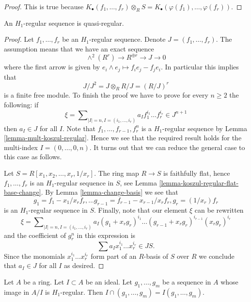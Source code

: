 \begin{proof}
This is true because
$K_\bullet(f_1, \ldots, f_r) \otimes_R S =
K_\bullet(\varphi(f_1), \ldots, \varphi(f_r))$.
\end{proof}

\begin{lemma}
\label{lemma-H1-regular-quasi-regular}
An $H_1$-regular sequence is quasi-regular.
\end{lemma}

\begin{proof}
Let $f_1, \ldots, f_r$ be an $H_1$-regular sequence.
Denote $J = (f_1, \ldots, f_r)$. The assumption means that we have
an exact sequence
$$
\wedge^2(R^r) \to R^{\oplus r} \to J \to 0
$$
where the first arrow is given by $e_i \wedge e_j \mapsto f_ie_j - f_je_i$.
In particular this implies that
$$
J/J^2 = J \otimes_R R/J = (R/J)^r
$$
is a finite free module. To finish the proof we have to prove
for every $n \geq 2$ the following: if
$$
\xi = \sum\nolimits_{|I| = n, I = (i_1, \ldots, i_r)}
a_I f_1^{i_1} \ldots f_r^{i_r} \in J^{n + 1}
$$
then $a_I \in J$ for all $I$. Note that $f_1, \ldots, f_{r - 1}, f_r^n$
is a $H_1$-regular sequence by
Lemma \ref{lemma-mult-koszul-regular}.
Hence we see that the required result holds for
the multi-index $I = (0, \ldots, 0, n)$. It turns out that we can
reduce the general case to this case as follows.

\medskip\noindent
Let $S = R[x_1, x_2, \ldots, x_r, 1/x_r]$.
The ring map $R \to S$ is faithfully
flat, hence $f_1, \ldots, f_r$ is an $H_1$-regular sequence in $S$, see
Lemma \ref{lemma-koszul-regular-flat-base-change}.
By
Lemma \ref{lemma-change-basis}
we see that
$$
g_1 = f_1 - x_1/x_r f_r, \ldots
g_{r - 1} = f_{r - 1} - x_{r - 1}/x_r f_r,
g_r = (1/x_r)f_r
$$
is an $H_1$-regular sequence in $S$. Finally, note that our element
$\xi$ can be rewritten
$$
\xi = \sum\nolimits_{|I| = n, I = (i_1, \ldots, i_r)}
a_I (g_1 + x_r g_r)^{i_1} \ldots (g_{r - 1} + x_r g_r)^{i_{r - 1}}
(x_rg_r)^{i_r}
$$
and the coefficient of $g_r^n$ in this expression is
$$
\sum a_I x_1^{i_1} \ldots x_r^{i_r} \in JS.
$$
Since the monomials $x_1^{i_1} \ldots x_r^{i_r}$ form part of an $R$-basis
of $S$ over $R$ we conclude that $a_I \in J$ for all $I$ as desired.
\end{proof}

\begin{lemma}
\label{lemma-H1-regular-in-quotient}
Let $A$ be a ring. Let $I \subset A$ be an ideal.
Let $g_1, \ldots, g_m$ be a sequence in $A$ whose image in
$A/I$ is $H_1$-regular. Then $I \cap (g_1, \ldots, g_m) =
I(g_1, \ldots, g_m)$.
\end{lemma}

